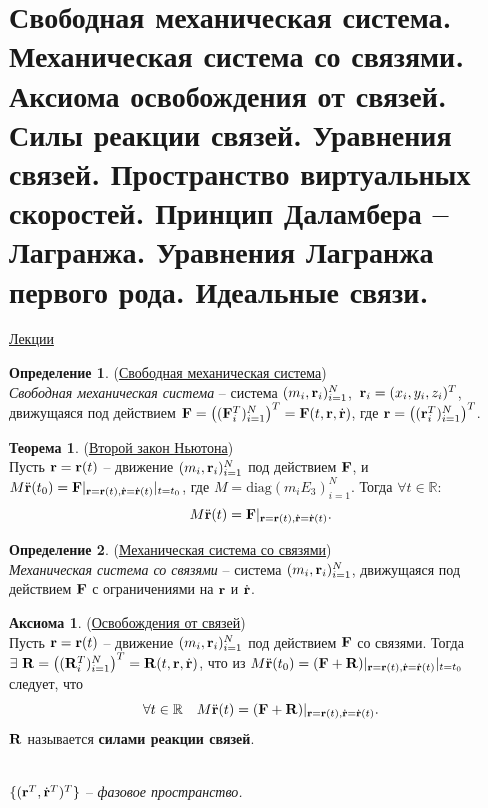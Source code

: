 \documentclass[specialist, subf, href, colorlinks=true, 12pt, times, mtpro, final]{disser}
\theoremstyle{definition}
\newtheorem{defn}{Определение}[section]
\newtheorem{theorem}{Теорема}[section]
\newtheorem{axiom}{Аксиома}[section]
\def\bfrd{\dot{\bfr}}
\def\bfrdd{\ddot{\bfr}}
\begin{document}
    \section{Свободная механическая система. Механическая система со связями. Аксиома освобождения от связей. Силы реакции связей. Уравнения связей. Пространство виртуальных скоростей. Принцип Даламбера – Лагранжа. Уравнения Лагранжа первого рода. Идеальные связи.}
    \label{1}
    \hyperlink {first_lects.1}{Лекции}
    \begin{defn} (\hyperlink{first_lects.1}{Свободная механическая система})\\
    {\it Свободная механическая система} -- система $(m_i, \mathbf{r}_i)_{i=1}^N$,\ 
    $\mathbf{r}_i = (x_i, y_i, z_i)^T$, движущаяся под действием $\bfF = \left((\bfF_i^T)_{i=1}^N\right)^T
    = \bfF(t,\bfr,\bfrd)$, где $\mathbf{r} = \left((\mathbf{r}_i^T)_{i=1}^N\right)^T$.
    \end{defn}
    \begin{theorem} (\hyperlink{first_lects.1}{Второй закон Ньютона})\\
    Пусть $\mathbf{r}=\mathbf{r}(t)$ -- движение $(m_i, \mathbf{r}_i)_{i=1}^N$ под действием $\mathbf{F}$,
    и $M\bfrdd(t_0) = \bfF|_{\bfr = \bfr(t), \bfrd=\bfrd(t)}|_{t=t_0}$, где
    $M = \text{diag}(m_iE_3)_{i=1}^N$. Тогда $\forall t \in \mathbb{R}$:
    $$M\bfrdd(t) = \bfF|_{\bfr=\bfr(t), \bfrd = \bfrd(t)}.$$
    \end{theorem}
    \begin{defn} (\hyperlink{first_lects.1}{Механическая система со связями})\\
    {\it Механическая система со связями} -- система $(m_i, \mathbf{r}_i)_{i=1}^N$, движущаяся под
    действием $\mathbf{F}$ с ограничениями на $\mathbf{r}$ и $\bfrd$.
    \end{defn}
    \begin{axiom} (\hyperlink{first_lects.1}{Освобождения от связей})\\
    Пусть $\mathbf{r}=\mathbf{r}(t)$ -- движение $(m_i, \mathbf{r}_i)_{i=1}^N$ под действием $\mathbf{F}$ со
    связями. Тогда $\exists\  \bfR=\left((\bfR_i^T)_{i=1}^N\right)^T = \bfR(t,\bfr,\bfrd)$,
    что из $M\bfrdd(t_0) = (\bfF + \bfR)|_{\bfr = \bfr(t), \bfrd=\bfrd(t)}|_{t=t_0}$
    следует, что
    $$\forall t \in \mathbb{R}\ \ \ M\bfrdd(t) = (\bfF + \bfR)|_{\bfr = \bfr(t), \bfrd=\bfrd(t)}.$$
    $\mathbf{R}$ называется {\bf силами реакции связей}.
    \end{axiom}
    \\
    $\{(\bfr^T, \bfrd^T)^T\}$ -- {\it фазовое пространство.}\\
\end{document}

